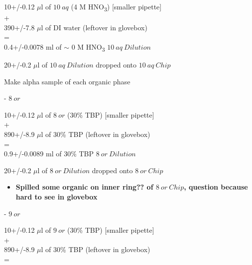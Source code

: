 \documentclass[idxtotoc,hyperref,openany,oneside]{labbook} %
\newcommand{\cmark}{\ding{51}}%
\newcommand{\done}{\rlap{$\square$}{\raisebox{2pt}{\large\hspace{1pt}\cmark}}%
  \hspace{-2.5pt}}
\newcommand{\tsbs}{\textsubscript}
\begin{document}
\begin{todolist}
\begin{todolist}
\end{todolist}
\begin{center}
10+/-0.12 $\mu$l of $\boxed{10\ aq}$ (4 M HNO\tsbs{3}) [smaller pipette]\\
+\\
390+/-7.8 $\mu$l of DI water (leftover in glovebox)\\
=\\
0.4+/-0.0078 ml of $\sim$ 0 M HNO\tsbs{3} $\boxed{10\ aq\ Dilution}$
\end{center}
\vspace{0.3cm}
\begin{center}
  20+/-0.2 $\mu$l of $\boxed{10\ aq\ Dilution}$ dropped onto
  $\boxed{10\ aq\ Chip}$
\end{center}


\item[\done]{Make alpha sample of each organic phase}
\begin{todolist}
\item[\done]{- $\boxed{8\ or}$}
\end{todolist}
\begin{center}
10+/-0.12 $\mu$l of $\boxed{8\ or}$ (30\% TBP) [smaller pipette]\\
+\\
890+/-8.9 $\mu$l of 30\% TBP (leftover in glovebox)\\
=\\
0.9+/-0.0089 ml of 30\% TBP $\boxed{8\ or\ Dilution}$
\end{center}
\vspace{0.3cm}
\begin{center}
  20+/-0.2 $\mu$l of $\boxed{8\ or\ Dilution}$ dropped onto
  $\boxed{8\ or\ Chip}$
\end{center}
\begin{itemize}
\item{\textbf{Spilled some organic on inner ring??
    of $\boxed{8\ or\ Chip}$, question because hard to see in
    glovebox}}
\end{itemize}
\begin{todolist}
\item[\done]{- $\boxed{9\ or}$}
\end{todolist}
\begin{center}
10+/-0.12 $\mu$l of $\boxed{9\ or}$ (30\% TBP) [smaller pipette]\\
+\\
890+/-8.9 $\mu$l of 30\% TBP (leftover in glovebox)\\
=\\

\end{center}
\end{todolist}
\end{document}
